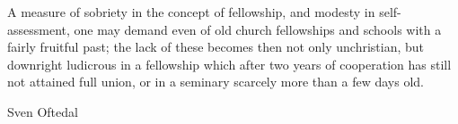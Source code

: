 A measure of sobriety in the concept of fellowship, and modesty in self-assessment, one may demand even of old church fellowships and schools with a fairly fruitful past; the lack of these becomes then not only unchristian, but downright ludicrous in a fellowship which after two years of cooperation has still not attained full union, or in a seminary scarcely more than a few days old.

Sven Oftedal
